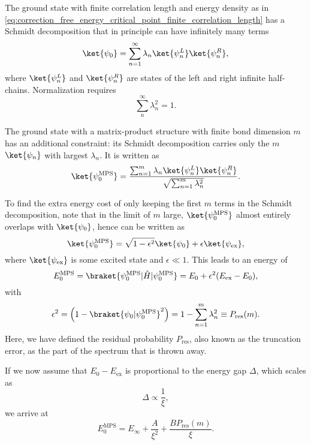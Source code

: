 The ground state with finite correlation length and energy density as in
\autoref{eq:correction_free_energy_critical_point_finite_correlation_length} has a Schmidt decomposition that in
principle can have infinitely many terms
\begin{equation}\label{eq:ground_state_infinite_schmidt_decomposition}
  \ket{\psi_0} = \sum_{n = 1}^{\infty} \lambda_n \ket{\psi_{n}^{L}}\ket{\psi_{n}^{R}},
\end{equation}
where $\ket{\psi_{n}^{L}}$ and $\ket{\psi_{n}^{R}}$ are states of the left and right infinite half-chains. Normalization
requires
\begin{equation}
  \sum_{n}^{\infty} \lambda_{n}^2 = 1.
\end{equation}

The ground state with a matrix-product structure with finite bond dimension $m$ has an additional constraint:
its Schmidt decomposition carries only the $m$ $\ket{\psi_n}$ with largest $\lambda_n$.
It is written as
\begin{equation}
  \ket{\psi_{0}^{\text{MPS}}} = \frac{\sum_{n = 1}^{m} \lambda_n
  \ket{\psi_{n}^{L}}\ket{\psi_{n}^{R}}}{\sqrt{\sum_{n=1}^{m} \lambda_{n}^2}}.
\end{equation}

To find the extra energy cost of only keeping the first $m$ terms in the Schmidt decomposition,
note that in the limit of $m$ large, $\ket{\psi_{0}^{\text{MPS}}}$ almost entirely overlaps with $\ket{\psi_0}$,
hence can be written as
\begin{equation}
  \ket{\psi_{0}^{\text{MPS}}} = \sqrt{1 - \epsilon^2} \ket{\psi_0} + \epsilon \ket{\psi_{\text{ex}}},
\end{equation}
where $\ket{\psi_{\text{ex}}}$ is some excited state and $\epsilon \ll 1$. This leads to an energy of
\begin{equation}
  E_{0}^{\text{MPS}} = \braket{\psi_{0}^{\text{MPS}} | \hat{H} | \psi_{0}^{\text{MPS}}} = E_0 + \epsilon^2 (E_{\text{ex}} - E_0),
\end{equation}
with
\begin{equation}
  \epsilon^2 = \left(1 - \braket{\psi_0 | \psi_{0}^{\text{MPS}}}^2 \right) = 1 - \sum_{n = 1}^{m} \lambda_{n}^2 \equiv
  P_{\text{res}}(m).
\end{equation}
Here, we have defined the residual probability $P_{\text{res}}$, also known as the truncation error,
as the part of the spectrum that is thrown away.

If we now assume that $E_0 - E_{\text{ex}}$ is proportional to the energy gap $\Delta$, which scales as \cite{lieb1961two, mata1989energy, pfeuty1970one}
\begin{equation}
  \Delta \propto \frac{1}{\xi},
\end{equation}
we arrive at
\begin{equation}\label{eq:correction_energy_mps_ground_state}
  E_{0}^{\text{MPS}} = E_{\infty} + \frac{A}{\xi^2} + \frac{B P_{\text{res}}(m)}{\xi}.
\end{equation}

